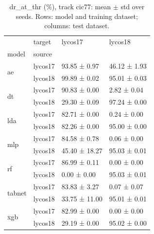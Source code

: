 \begin{table}
\caption{dr_at_thr (\%), track cic77: mean $\pm$ std over seeds. Rows: model and training dataset; columns: test dataset.}
\label{tab:matrix_cic77_dr_at_thr}
\begin{tabular}{llll}
\toprule
 & target & lycos17 & lycos18 \\
model & source &  &  \\
\midrule
\multirow[t]{2}{*}{ae} & lycos17 & 93.85 ± 0.97 & 46.12 ± 1.93 \\
 & lycos18 & 99.89 ± 0.02 & 95.01 ± 0.03 \\
\cline{1-4}
\multirow[t]{2}{*}{dt} & lycos17 & 90.83 ± 0.00 & 2.82 ± 0.04 \\
 & lycos18 & 29.30 ± 0.09 & 97.24 ± 0.00 \\
\cline{1-4}
\multirow[t]{2}{*}{lda} & lycos17 & 82.71 ± 0.00 & 0.24 ± 0.00 \\
 & lycos18 & 82.26 ± 0.00 & 95.00 ± 0.00 \\
\cline{1-4}
\multirow[t]{2}{*}{mlp} & lycos17 & 84.58 ± 0.78 & 0.06 ± 0.00 \\
 & lycos18 & 45.40 ± 18.27 & 95.03 ± 0.01 \\
\cline{1-4}
\multirow[t]{2}{*}{rf} & lycos17 & 86.99 ± 0.11 & 0.00 ± 0.00 \\
 & lycos18 & 0.00 ± 0.00 & 95.03 ± 0.01 \\
\cline{1-4}
\multirow[t]{2}{*}{tabnet} & lycos17 & 83.83 ± 3.27 & 0.07 ± 0.07 \\
 & lycos18 & 33.75 ± 11.00 & 95.01 ± 0.01 \\
\cline{1-4}
\multirow[t]{2}{*}{xgb} & lycos17 & 82.99 ± 0.00 & 0.00 ± 0.00 \\
 & lycos18 & 29.19 ± 0.00 & 95.02 ± 0.00 \\
\cline{1-4}
\bottomrule
\end{tabular}
\end{table}
